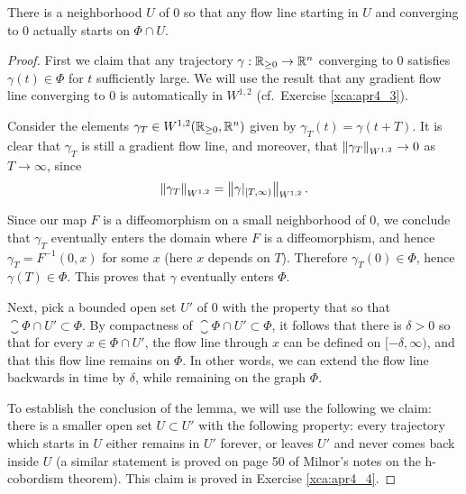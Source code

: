 \begin{lemma}\label{lemma:apr4_5}
  There is a neighborhood $U$ of $0$ so that any flow line starting in $U$ and converging to $0$ actually starts on $\Phi\cap U$.
\end{lemma}
\begin{proof}
  First we claim that any trajectory $\gamma:\mathbb{R}_{\ge 0}\to \mathbb{R}^{n}$ converging to $0$ satisfies $\gamma(t)\in \Phi$ for $t$ sufficiently large. We will use the result that any gradient flow line converging to $0$ is automatically in $W^{1,2}$ (cf.\ Exercise \ref{xca:apr4_3}).

  Consider the elements $\gamma_{T}\in W^{1,2}(\mathbb{R}_{\ge 0},\mathbb{R}^{n})$ given by $\gamma_{T}(t)=\gamma(t+T)$. It is clear that $\gamma_{T}$ is still a gradient flow line, and moreover, that $\left\lVert\gamma_{T}\right\rVert_{W^{1,2}}\to 0$ as $T\to\infty$, since
  \begin{equation*}
    \left\lVert\gamma_{T}\right\rVert_{W^{1,2}}=\left\lVert\gamma|_{[T,\infty)}\right\rVert_{W^{1,2}}.
  \end{equation*}

  Since our map $F$ is a diffeomorphism on a small neighborhood of $0$, we conclude that $\gamma_{T}$ eventually enters the domain where $F$ is a diffeomorphism, and hence $\gamma_{T}=F^{-1}(0,x)$ for some $x$ (here $x$ depends on $T$). Therefore $\gamma_{T}(0)\in \Phi$, hence $\gamma(T)\in \Phi$. This proves that $\gamma$ eventually enters $\Phi$.

  Next, pick a bounded open set $U'$ of $0$ with the property that so that $\closure{\Phi \cap U'}\subset \Phi$. By compactness of $\closure{\Phi\cap U'}\subset \Phi$, it follows that there is $\delta>0$ so that for every $x\in \Phi\cap U'$, the flow line through $x$ can be defined on $[-\delta,\infty)$, and that this flow line remains on $\Phi$. In other words, we can extend the flow line backwards in time by $\delta$, while remaining on the graph $\Phi$.
  
  To establish the conclusion of the lemma, we will use the following we claim: there is a smaller open set $U\subset U'$ with the following property: every trajectory which starts in $U$ either remains in $U'$ forever, or leaves $U'$ and never comes back inside $U$ (a similar statement is proved on page 50 of Milnor's notes on the h-cobordism theorem). This claim is proved in Exercise \ref{xca:apr4_4}.


\end{proof}
